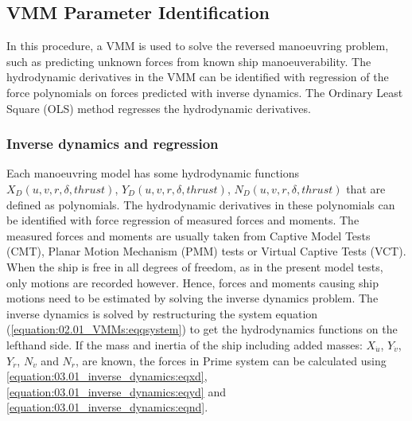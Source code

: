 \subsection{VMM Parameter Identification} \label{sec:PIT_VMM}
In this procedure, a VMM is used to solve the reversed manoeuvring problem, such as predicting unknown forces from known ship manoeuverability. The hydrodynamic derivatives in the VMM can be identified with regression of the force polynomials on forces predicted with inverse dynamics. The Ordinary Least Square (OLS) method regresses the hydrodynamic derivatives. 

\subsubsection{Inverse dynamics and regression}
\label{\detokenize{03.01_inverse_dynamics:inverse-dynamics-and-regression}}\label{\detokenize{03.01_inverse_dynamics::doc}}
\sphinxAtStartPar
Each manoeuvring model has some hydrodynamic functions \(X_D(u,v,r,\delta,thrust)\), \(Y_D(u,v,r,\delta,thrust)\), \(N_D(u,v,r,\delta,thrust)\) that are defined as polynomials. The hydrodynamic derivatives in these polynomials can be identified with force regression of measured forces and moments. The measured forces and moments are usually taken from Captive Model Tests (CMT), Planar Motion Mechanism (PMM) tests or Virtual Captive Tests (VCT). When the ship is free in all degrees of freedom, as in the present model tests, only
motions are recorded however. Hence, forces and moments causing ship motions need to be estimated by
solving the inverse dynamics problem.
The inverse dynamics is solved by restructuring the system equation (\autoref{equation:02.01_VMMs:eqqsystem}) to get the hydrodynamics functions on the left\sphinxhyphen{}hand side. If the mass and inertia of the ship including added masses: \(X_{\dot{u}}\), \(Y_{\dot{v}}\), \(Y_{\dot{r}}\), \(N_{\dot{v}}\) and \(N_{\dot{r}}\), are known, the forces in Prime system can be calculated using \autoref{equation:03.01_inverse_dynamics:eqxd}, \autoref{equation:03.01_inverse_dynamics:eqyd} and \autoref{equation:03.01_inverse_dynamics:eqnd}.
